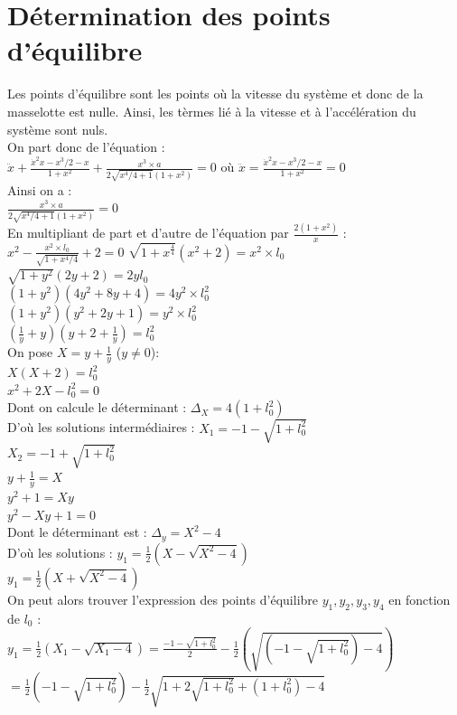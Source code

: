 \documentclass[10pt,a4paper]{article}
\begin{document}
\section{Détermination des points d'équilibre}
Les points d'équilibre sont les points où la vitesse du système et donc de la masselotte est nulle. Ainsi, les tèrmes lié à la vitesse et à l'accélération du système sont nuls.\\
On part donc de l'équation :\\
$ \ddot{x}+\frac{\dot{x}^2x-x^3/2-x}{1+x^2}+\frac{x^3\times a}{2\sqrt{x^4/4+1}(1+x^2)}=0 $
où 
$\ddot{x}=\frac{\dot{x}^2x-x^3/2-x}{1+x^2}=0$\\
Ainsi on a :\\
$\frac{x^3\times a}{2\sqrt{x^4/4+1}(1+x^2)}=0$\\
En multipliant de part et d'autre de l'équation par $\frac{2(1+x^2)}{x}$ :\\
$x^2-\frac{x^2\times l_0}{\sqrt{1+x^4/4}}+2=0$
$\sqrt{1+x^\frac{4}{4}}(x^2+2)=x^2\times l_0$\\
$\sqrt{1+y^2}(2y+2)=2yl_0$\\
$(1+y^2)(4y^2+8y+4)=4y^2\times l_0^2$\\
$(1+y^2)(y^2+2y+1)=y^2\times l_0^2$\\
$(\frac{1}{y}+y)(y+2+\frac{1}{y})=l_0^2$\\
On pose $X=y+\frac{1}{y}$ ($y\neq 0$):\\
$X(X+2)=l_0^2$\\
$x^2+2X-l_0^2=0$\\
Dont on calcule le déterminant :
$\Delta_X=4(1+l_0^2)$\\
D'où les solutions intermédiaires :
$X_1=-1-\sqrt{1+l_0^2}$\\
$X_2=-1+\sqrt{1+l_0^2}$\\
$y+\frac{1}{y}=X$\\
$y^2+1=Xy$\\
$y^2-Xy+1=0$\\
Dont le déterminant est :
$\Delta_y=X^2-4$\\
D'où les solutions :
$y_1=\frac{1}{2}(X-\sqrt{X^2-4})$\\
$y_1=\frac{1}{2}(X+\sqrt{X^2-4})$\\
On peut alors trouver l'expression des points d'équilibre $y_1,y_2,y_3,y_4$ en fonction de $l_0$ :\\
$y_1=\frac{1}{2}(X_1-\sqrt{X_1-4})=\frac{-1-\sqrt{1+l_0^2}}{2}-\frac{1}{2}(\sqrt{(-1-\sqrt{1+l_0^2})-4})$\\
$=\frac{1}{2}(-1-\sqrt{1+l_0^2})-\frac{1}{2}\sqrt{1+2\sqrt{1+l_0^2}+(1+l_0^2)-4}$\\
\end{document}
